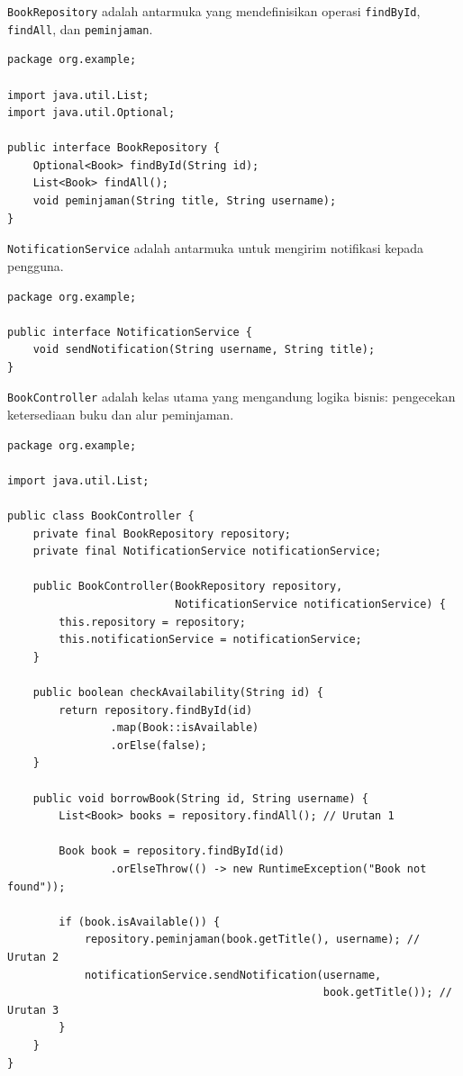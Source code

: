 \documentclass[a4paper,oneside,12pt]{report}
\begin{document}
\texttt{BookRepository} adalah antarmuka yang mendefinisikan operasi \texttt{findById}, \texttt{findAll}, dan \texttt{peminjaman}.

\begin{lstlisting}[style=javastyle, caption={BookRepository.java}]
package org.example;

import java.util.List;
import java.util.Optional;

public interface BookRepository {
    Optional<Book> findById(String id);
    List<Book> findAll();
    void peminjaman(String title, String username);
}
\end{lstlisting}

\texttt{NotificationService} adalah antarmuka untuk mengirim notifikasi kepada pengguna.

\begin{lstlisting}[style=javastyle, caption={NotificationService.java}]
package org.example;

public interface NotificationService {
    void sendNotification(String username, String title);
}
\end{lstlisting}

\texttt{BookController} adalah kelas utama yang mengandung logika bisnis: pengecekan ketersediaan buku dan alur peminjaman.

\begin{lstlisting}[style=javastyle, caption={BookController.java}]
package org.example;

import java.util.List;

public class BookController {
    private final BookRepository repository;
    private final NotificationService notificationService;

    public BookController(BookRepository repository,
                          NotificationService notificationService) {
        this.repository = repository;
        this.notificationService = notificationService;
    }

    public boolean checkAvailability(String id) {
        return repository.findById(id)
                .map(Book::isAvailable)
                .orElse(false);
    }

    public void borrowBook(String id, String username) {
        List<Book> books = repository.findAll(); // Urutan 1

        Book book = repository.findById(id)
                .orElseThrow(() -> new RuntimeException("Book not found"));

        if (book.isAvailable()) {
            repository.peminjaman(book.getTitle(), username); // Urutan 2
            notificationService.sendNotification(username,
                                                 book.getTitle()); // Urutan 3
        }
    }
}
\end{lstlisting}
\end{document}
